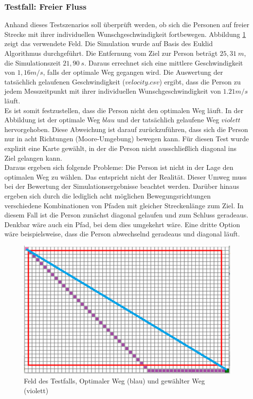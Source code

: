 \subsubsection{Testfall: Freier Fluss}
Anhand dieses Testszenarios soll überprüft werden, ob sich die Personen auf freier Strecke mit ihrer individuellen Wunschgeschwindigkeit fortbewegen. Abbildung \ref{fig:freeflowVGLmap} zeigt das verwendete Feld. Die Simulation wurde auf Basis des Euklid Algorithmus durchgeführt. Die Entfernung vom Ziel zur Person beträgt $25,31\ m$, die Simulationszeit $21,90\ s$. Daraus errechnet sich eine mittlere Geschwindigkeit von $1,16 m/s$, falls der optimale Weg gegangen wird. Die Auswertung der tatsächlich gelaufenen Geschwindigkeit ($velocity.csv$) ergibt, dass die Person zu jedem Messzeitpunkt mit ihrer individuellen Wunschgeschwindigkeit von $1.21 m/s$ läuft. \\
Es ist somit festzustellen, dass die Person nicht den optimalen Weg läuft. In der Abbildung ist der optimale Weg $blau$ und der tatsächlich gelaufene Weg $violett$ hervorgehoben. Diese Abweichung ist darauf zurückzuführen, dass sich die Person nur in acht Richtungen (Moore-Umgebung) bewegen kann. Für diesen Test wurde explizit eine Karte gewählt, in der die Person nicht ausschließlich diagonal ins Ziel gelangen kann. \\
Daraus ergeben sich folgende Probleme: Die Person ist nicht in der Lage den optimalen Weg zu wählen. Das entspricht nicht der Realität. Dieser Umweg muss bei der Bewertung der Simulationsergebnisse beachtet werden. Darüber hinaus ergeben sich durch die lediglich acht möglichen Bewegungsrichtungen verschiedene Kombinationen von Pfaden mit gleicher Streckenlänge zum Ziel. In diesem Fall ist die Person zunächst diagonal gelaufen und zum Schluss geradeaus. Denkbar wäre auch ein Pfad, bei dem dies umgekehrt wäre. Eine dritte Option wäre beispielsweise, dass die Person abwechselnd geradeaus und diagonal läuft.

\begin{figure}[ht]
	\centering
	\includegraphics[width=\textwidth]{abbildungen/freeflowVGL.png}
	\caption{Feld des Testfalls, Optimaler Weg (blau) und gewählter Weg (violett)}
	\label{fig:freeflowVGLmap}
\end{figure}